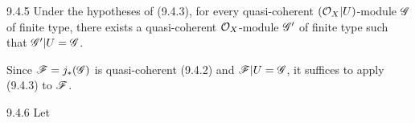 \documentclass[../main.tex]{subfiles}
\begin{document}
\begin{cx}[Corollary]{9.4.5}
    Under the hypotheses of (9.4.3), for every quasi-coherent $(\mathcal{O}_X|U)$-module $\mathscr{G}$ of finite type, there exists a quasi-coherent $\mathcal{O}_X$-module $\mathscr{G}'$ of finite type such that $\mathscr{G}'|U=\mathscr{G}$.
\end{cx}

Since $\mathscr{F}=j_*(\mathscr{G})$ is quasi-coherent (9.4.2) and $\mathscr{F}|U=\mathscr{G}$, it suffices to apply (9.4.3) to $\mathscr{F}$.

\begin{cx}[Lemma]{9.4.6}
    Let
\end{cx}
\end{document}
